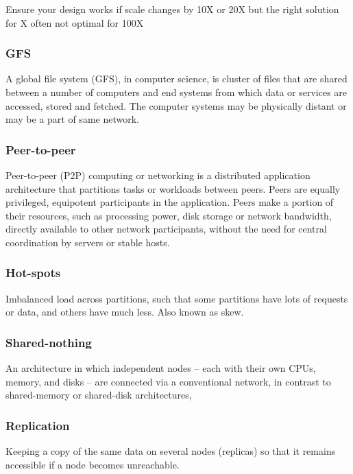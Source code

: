 \documentclass{article}
\begin{document}
    
    Ensure your design works if scale changes by 10X or 20X but the right solution for X often not optimal for 100X
    
    \subsubsection{GFS}
    A global file system (GFS), in computer science, is cluster of files that are shared between a number of computers and end systems from which data or services are accessed, stored and fetched. The computer systems may be physically distant or may be a part of same network.
    
    \subsubsection{Peer-to-peer}
    Peer-to-peer (P2P) computing or networking is a distributed application architecture that partitions tasks or workloads between peers. Peers are equally privileged, equipotent participants in the application. Peers make a portion of their resources, such as processing power, disk storage or network bandwidth, directly available to other network participants, without the need for central coordination by servers or stable hosts.
    
    
    \subsubsection{Hot-spots}
    Imbalanced load across partitions, such that some partitions have lots of requests or data, and others have much less. Also known as skew.
    
    \subsubsection{Shared-nothing}
    An architecture in which independent nodes -- each with their own CPUs, memory, and disks -- are connected via a conventional network, in contrast to shared-memory or shared-disk architectures,
    
    \subsubsection{Replication}
    Keeping a copy of the same data on several nodes (replicas) so that it remains accessible if a node becomes unreachable.
    
\end{document}
